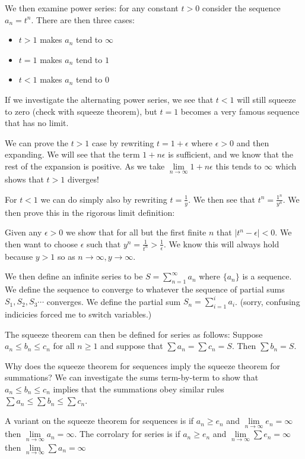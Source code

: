 \documentclass{report}
\begin{document}
We then examine power series: for any constant $t > 0$ consider the sequence $a_n = t^n$. There are then three cases:

\begin{itemize}
\item $t > 1$ makes $a_n$ tend to $\infty$
\item $t = 1$ makes $a_n$ tend to $1$
\item $t < 1$ makes $a_n$ tend to $0$
\end{itemize}

If we investigate the alternating power series, we see that $t < 1$ will still squeeze to zero (check with squeeze theorem), but $t = 1$ becomes a very famous sequence that has no limit.

We can prove the $t > 1$ case by rewriting $t = 1 + \epsilon$ where $\epsilon > 0$ and then expanding. We will see that the term $1 + n\epsilon$ is sufficient, and we know that the rest of the expansion is positive. As we take $\displaystyle\lim\limits_{n \to \infty} 1+n\epsilon $ this tends to $\infty$ which shows that $t > 1$ diverges!

For $t < 1$ we can do simply also by rewriting $t = \frac{1}{y}$. We then see that $t^n = \frac{1^n}{y^n}$. We then prove this in the rigorous limit definition:

Given any $\epsilon > 0$ we show that for all but the first finite $n$ that $|t^n - \epsilon| < 0$. We then want to choose $\epsilon$ such that $y^n = \frac{1}{t^n} > \frac{1}{\epsilon}$. We know this will always hold because $y > 1$ so as $n \to \infty, y \to \infty$.

We then define an infinite series to be $S = \displaystyle\sum_{n = 1}^\infty{a_n}$ where $\{a_n\}$ is a sequence. We define the sequence to converge to whatever the sequence of partial sums $S_1, S_2, S_3 \cdots$ converges. We define the partial sum $S_n = \displaystyle\sum_{i = 1}^i{a_i}$. (sorry, confusing indicicies forced me to switch variables.)

The squeeze theorem can then be defined for series as follows: Suppose $a_n \leq b_n \leq c_n$ for all $n \geq 1$ and suppose that $\sum{a_n} = \sum{c_n} = S$. Then $\sum{b_n} = S$.

Why does the squeeze theorem for sequences imply the squeeze theorem for summations? We can investigate the sums term-by-term to show that $a_n \leq b_n \leq c_n$ implies that the summations obey similar rules $\sum{a_n} \leq \sum{b_n} \leq \sum{c_n}$.

A variant on the squeeze theorem for sequences is if $a_n \geq e_n$ and $\displaystyle\lim\limits_{n \to\infty}{e_n} = \infty$ then $\displaystyle\lim\limits_{n\to\infty}{a_n} = \infty$. The corrolary for series is if $a_n \geq e_n$ and $\displaystyle\lim\limits_{n \to\infty}{\sum{e_n}} = \infty$ then $\displaystyle\lim\limits_{n\to\infty}{\sum{a_n}} = \infty$
\end{document}
